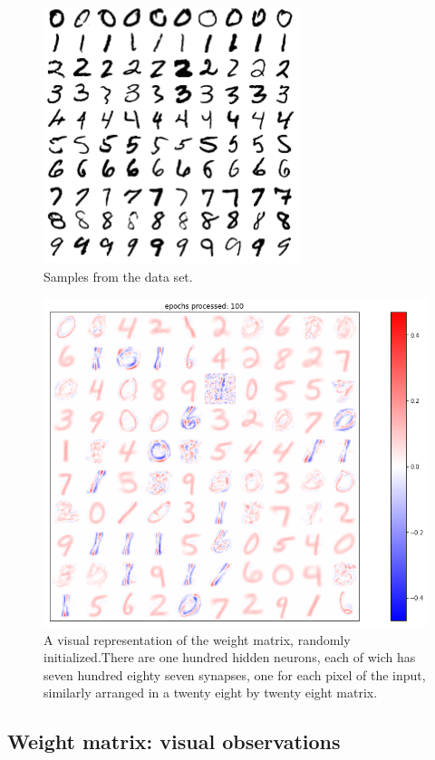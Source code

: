 \documentclass[a4paper]{report}
\begin{document}
\begin{figure} [H]
\centering
\includegraphics [width=7.5cm ] {o/mnist.png}
\caption{Samples from the data set.}
\label{mnist}
\end{figure}

\begin{figure} [H]
    \centering
    \includegraphics [width=12cm ] {h/uu_heatmap.png}
    \caption{A visual representation of the weight matrix, randomly initialized.There are one hundred hidden neurons, each of wich has seven hundred eighty seven synapses, one for each pixel of the input, similarly arranged in a twenty eight by twenty eight matrix.}
    \label{heatmap}
\end{figure}

\subsection{Weight matrix: visual observations}
\end{document}
